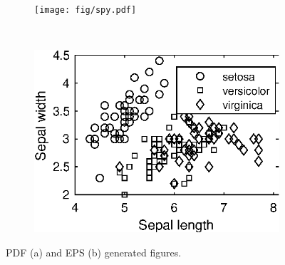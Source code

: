 	\begin{figure}[H]
		\centering
		\begin{subfigure}{\subfigsz\textwidth}
			\texttt{[image: fig/spy.pdf]}
		\end{subfigure}
		\
		\begin{subfigure}{\subfigsz\textwidth}
			\includegraphics{fig/gscatter.eps}
		\end{subfigure}
		\caption{PDF (a) and EPS (b) generated figures. \label{fig:math-stuff}}
	\end{figure}